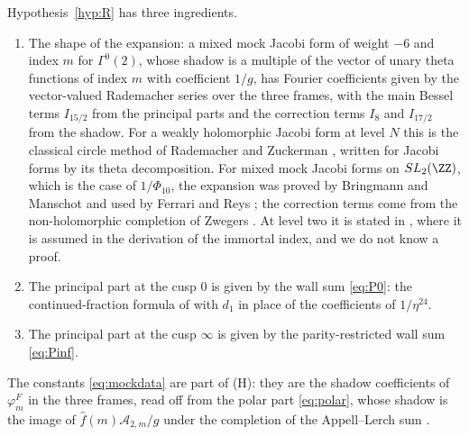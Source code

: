 \begin{remark}\label{rem:hypsource}
Hypothesis~\ref{hyp:R} has three ingredients.
\begin{enumerate}
\item[(H)] The shape of the expansion: a mixed mock Jacobi form of weight $-6$ and index $m$ for $\Gamma^0(2)$, whose shadow is a multiple of the vector of unary theta functions of index $m$ with coefficient $1/g$, has Fourier coefficients given by the vector-valued Rademacher series over the three frames, with the main Bessel terms $I_{15/2}$ from the principal parts and the correction terms $I_8$ and $I_{17/2}$ from the shadow. For a weakly holomorphic Jacobi form at level $N$ this is the classical circle method of Rademacher and Zuckerman \cite{RZ38,Zuc39}, written for Jacobi forms by its theta decomposition. For mixed mock Jacobi forms on $SL_2(\ZZ)$, which is the case of $1/\Phi_{10}$, the expansion was proved by Bringmann and Manschot \cite{BMa13} and used by Ferrari and Reys \cite{FR17}; the correction terms come from the non-holomorphic completion of Zwegers \cite{Zwe02}. At level two it is stated in \cite[\S4]{CNR21}, where it is assumed in the derivation of the immortal index, and we do not know a proof.
\item[(P0)] The principal part at the cusp $0$ is given by the wall sum \eqref{eq:P0}: the continued-fraction formula of \cite[(2.43)]{CNR21} with $d_1$ in place of the coefficients of $1/\eta^{24}$.
\item[(P$\infty$)] The principal part at the cusp $\infty$ is given by the parity-restricted wall sum \eqref{eq:Pinf}.
\end{enumerate}
The constants \eqref{eq:mockdata} are part of (H): they are the shadow coefficients of $\varphi^F_m$ in the three frames, read off from the polar part \eqref{eq:polar}, whose shadow is the image of $\hat f(m)\mathcal A_{2,m}/g$ under the completion of the Appell--Lerch sum \cite{Zwe02,DMZ12}.
\end{remark}

